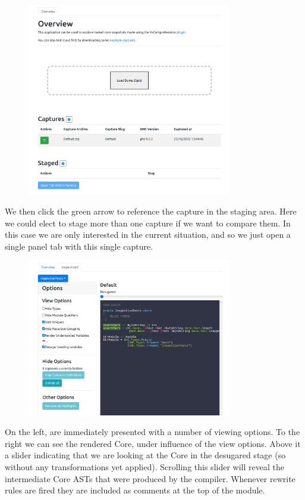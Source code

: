 \begin{figure}[H]
\centering
\includegraphics[width=0.8\textwidth]{figs/countchars_1.png}
\label{fig:countchars_1}
\end{figure}

We then click the green arrow to reference the capture in the staging area. Here we could elect to stage more
than one capture if we want to compare them. In this case we are only interested in the current situation, and so we
just open a single panel tab with this single capture.


\begin{figure}[H]
\centering
\includegraphics[width=0.8\textwidth]{figs/countchars_2.png}
\label{fig:countchars_2}
\end{figure}

On the left, are immediately presented with a number of viewing options. To the right we can see the rendered
Core, under influence of the view options. Above it a slider indicating that we are looking at the
Core in the desugared stage (so without any transformations yet applied). Scrolling this slider will reveal
the intermediate Core ASTs that were produced by the compiler. Whenever rewrite rules are fired they are included
as comments at the top of the module.

